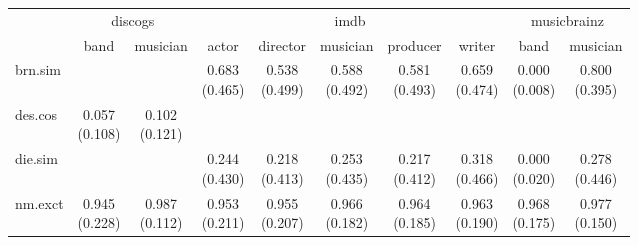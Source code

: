 \documentclass[epsfig,a4paper,11pt,titlepage,twoside,openany]{book}
\begin{document}
\begin{table}[h]
\centering
\begin{tabular}{l|c|c|c|c|c|c|c|c|c|}
\cline{2-10}
                                                           & \multicolumn{2}{c|}{discogs} & \multicolumn{5}{c|}{imdb}                                                & \multicolumn{2}{c|}{musicbrainz} \\ \cline{2-10} 
                                                           & band          & musician     & actor        & director     & musician     & producer     & writer       & band            & musician       \\ \hline
\multicolumn{1}{|l|}{brn.sim}                        &               &              & \makecell{0.683 \\ (0.465)} & \makecell{0.538 \\ (0.499)} & \makecell{0.588 \\ (0.492)} & \makecell{0.581 \\ (0.493)} & \makecell{0.659 \\ (0.474)} & \makecell{0.000 \\ (0.008)}    & \makecell{0.800 \\ (0.395)}   \\ \hline
\multicolumn{1}{|l|}{des.cos}                  & \makecell{0.057 \\ (0.108)}  & \makecell{0.102 \\ (0.121)} &              &              &              &              &              &                 &                \\ \hline
\multicolumn{1}{|l|}{die.sim}                        &               &              & \makecell{0.244 \\ (0.430)} & \makecell{0.218 \\ (0.413)} & \makecell{0.253 \\ (0.435)} & \makecell{0.217 \\ (0.412)} & \makecell{0.318 \\ (0.466)} & \makecell{0.000 \\ (0.020)}    & \makecell{0.278 \\ (0.446)}   \\ \hline
\multicolumn{1}{|l|}{nm.exct}                          & \makecell{0.945 \\ (0.228)}  & \makecell{0.987 \\ (0.112)} & \makecell{0.953 \\ (0.211)} & \makecell{0.955 \\ (0.207)} & \makecell{0.966 \\ (0.182)} & \makecell{0.964 \\ (0.185)} & \makecell{0.963 \\ (0.190)} & \makecell{0.968 \\ (0.175)}    & \makecell{0.977 \\ (0.150)}   \\ \hline

\end{tabular}
\end{table}
\end{document}
